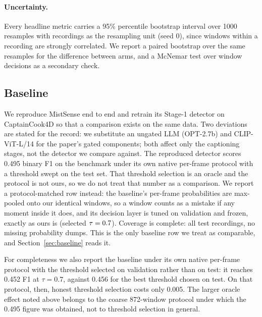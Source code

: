 \documentclass[10pt,twocolumn]{article}
\begin{document}
\paragraph{Uncertainty.} Every headline metric carries a 95\% percentile
bootstrap interval over 1000 resamples with recordings as the resampling unit
(seed 0), since windows within a recording are strongly correlated. We report a
paired bootstrap over the same resamples for the difference between arms, and a
McNemar test over window decisions as a secondary check.

\subsection{Baseline}
We reproduce MistSense \citep{patsch2025mistsense} end to end and retrain its
Stage-1 detector on CaptainCook4D so that a comparison exists on the same data.
Two deviations are stated for the record: we substitute an ungated LLM
(OPT-2.7b) and CLIP-ViT-L/14 for the paper's gated components; both affect only
the captioning stages, not the detector we compare against. The reproduced
detector scores 0.495 binary F1 on the benchmark under its own native per-frame
protocol with a threshold swept on the test set. That threshold selection is an
oracle and the protocol is not ours, so we do not treat that number as a
comparison. We report a protocol-matched row instead: the baseline's per-frame probabilities are
max-pooled onto our identical \resWindows{} windows, so a window counts as a
mistake if any moment inside it does, and its decision layer is tuned on
validation and frozen, exactly as ours is (selected $\tau=0.7$). Coverage is
complete: all \resClips{} test recordings, no missing probability dumps. This is
the only baseline row we treat as comparable, and
Section~\ref{sec:baseline} reads it.

For completeness we also report the baseline under its own native per-frame
protocol with the threshold selected on validation rather than on test: it
reaches 0.452 F1 at $\tau=0.7$, against 0.456 for the best threshold chosen on
test. On that protocol, then, honest threshold selection costs only 0.005. The
larger oracle effect noted above belongs to the coarse 872-window protocol under
which the 0.495 figure was obtained, not to threshold selection in general.
\end{document}
